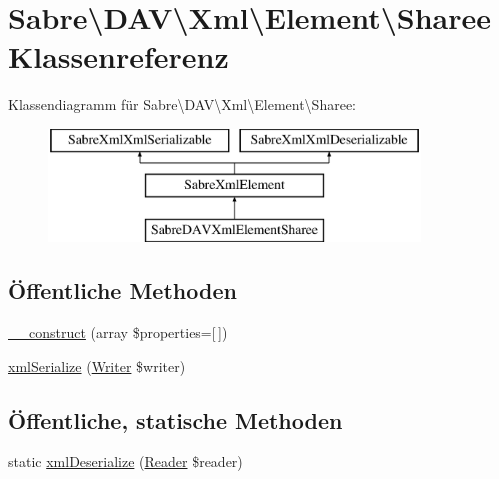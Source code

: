 \hypertarget{class_sabre_1_1_d_a_v_1_1_xml_1_1_element_1_1_sharee}{}\section{Sabre\textbackslash{}D\+AV\textbackslash{}Xml\textbackslash{}Element\textbackslash{}Sharee Klassenreferenz}
\label{class_sabre_1_1_d_a_v_1_1_xml_1_1_element_1_1_sharee}
Klassendiagramm für Sabre\textbackslash{}D\+AV\textbackslash{}Xml\textbackslash{}Element\textbackslash{}Sharee\+:\begin{figure}[H]
\begin{center}
\leavevmode
\includegraphics[height=3.000000cm]{class_sabre_1_1_d_a_v_1_1_xml_1_1_element_1_1_sharee}
\end{center}
\end{figure}
\subsection*{Öffentliche Methoden}
\begin{DoxyCompactItemize}
\item 
\mbox{\hyperlink{class_sabre_1_1_d_a_v_1_1_xml_1_1_element_1_1_sharee_a7c0c9ac84b5e917b09940342baf54dd5}{\+\_\+\+\_\+construct}} (array \$properties=\mbox{[}$\,$\mbox{]})
\item 
\mbox{\hyperlink{class_sabre_1_1_d_a_v_1_1_xml_1_1_element_1_1_sharee_a6f2e1948f0aa0f060714080ce5ab40a2}{xml\+Serialize}} (\mbox{\hyperlink{class_sabre_1_1_xml_1_1_writer}{Writer}} \$writer)
\end{DoxyCompactItemize}
\subsection*{Öffentliche, statische Methoden}
\begin{DoxyCompactItemize}
\item 
static \mbox{\hyperlink{class_sabre_1_1_d_a_v_1_1_xml_1_1_element_1_1_sharee_a6bda646293a5c5801abc70374c62473e}{xml\+Deserialize}} (\mbox{\hyperlink{class_sabre_1_1_xml_1_1_reader}{Reader}} \$reader)
\end{DoxyCompactItemize}
